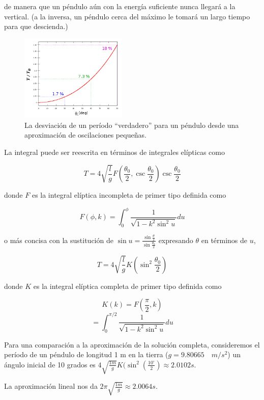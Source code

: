 \documentclass[DIV=calc, paper=a4, fontsize=12pt, twocolumn]{scrartcl}	 %
\begin{document}
de manera que un péndulo aún con la energía suficiente nunca llegará a la vertical. (a la inversa, un péndulo cerca del máximo le tomará un largo tiempo para que descienda.)

\begin{figure}[hb]
  \centering
  \includegraphics[width=2in]{pendulosimple4.png}
  \caption[Close up of \textit{Hemidactylus} sp.]
   {La desviación de un período “verdadero” para un péndulo desde una aproximación de oscilaciones pequeñas. }
\end{figure}
\vspace{0.5cm}

La integral puede ser reescrita en términos de integrales elípticas como

$$ T= 4\sqrt{\frac{l}{g}}F(\frac{\theta_{0}}{2},\csc{\frac{\theta_{0}}{2}})\csc{\frac{\theta_{0}}{2}}$$

donde $F$ es la integral elíptica incompleta de primer tipo definida como

$$F(\phi,k) = \int_{0}^{\phi}\frac{1}{\sqrt{1-k^{2}\sin^{2}{u}}}du$$

o más concisa con la sustitución de $\sin{u} = \frac{\sin{\frac{\theta}{2}}}{\sin{\frac{\theta_{0}}{2}}}$ expresando $\theta$ en términos de $u$,

\begin{equation}
T = 4\sqrt{\frac{l}{g}}K(\sin^{2}{\frac{\theta_{0}}{2}})
\end{equation}


donde $K$ es la integral elíptica completa de primer tipo definida como 

$$ K(k) = F(\frac{\pi}{2},k)$$
$$ = \int_{0}^{\pi/2}\frac{1}{\sqrt{1-k^{2}\sin^{2}{u}}}du$$ 

Para una comparación a la aproximación de la solución completa, consideremos el período de un péndulo de longitud 1 m en la tierra ($g=9.80665 \quad m/s^{2}$) un ángulo inicial de 10 grados es $4\sqrt{\frac{1m}{g}}K(\sin^{2}{(\frac{10^{\circ}}{2})} \approx 2.0102 s.$

La aproximación lineal nos da $2\pi\sqrt{\frac{1m}{g}} \approx 2.0064s.$
\end{document}
